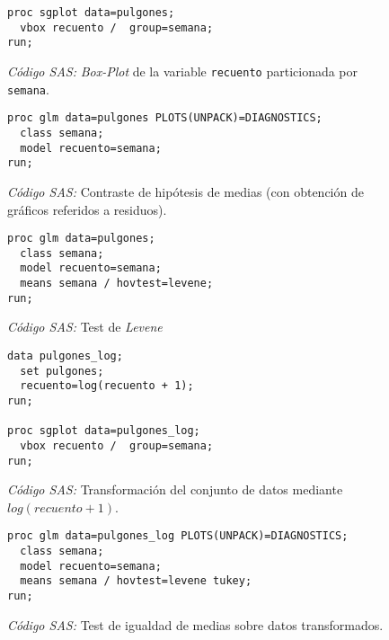 \documentclass[11pt]{article}
\begin{document}
    \begin{figure}[!h]
      \centering
      \begin{verbatim}
proc sgplot data=pulgones;
  vbox recuento /  group=semana;
run;
      \end{verbatim}
      \caption{\emph{Código SAS:} \emph{Box-Plot} de la variable \texttt{recuento} particionada por \texttt{semana}.}
      \label{code:sas_4}
    \end{figure}

    \begin{figure}[!h]
      \centering
      \begin{verbatim}
proc glm data=pulgones PLOTS(UNPACK)=DIAGNOSTICS;
  class semana;
  model recuento=semana;
run;
      \end{verbatim}
      \caption{\emph{Código SAS:} Contraste de hipótesis de medias (con obtención de gráficos referidos a residuos).}
      \label{code:sas_5}
    \end{figure}

    \begin{figure}[!h]
      \centering
      \begin{verbatim}
proc glm data=pulgones;
  class semana;
  model recuento=semana;
  means semana / hovtest=levene;
run;
      \end{verbatim}
      \caption{\emph{Código SAS:} Test de \emph{Levene}}
      \label{code:sas_6}
    \end{figure}


    \begin{figure}[!h]
      \centering
      \begin{verbatim}
data pulgones_log;
  set pulgones;
  recuento=log(recuento + 1);
run;

proc sgplot data=pulgones_log;
  vbox recuento /  group=semana;
run;
      \end{verbatim}
      \caption{\emph{Código SAS:} Transformación del conjunto de datos mediante $log(recuento + 1)$.}
      \label{code:sas_7}
    \end{figure}

    \begin{figure}[!h]
      \centering
      \begin{verbatim}
proc glm data=pulgones_log PLOTS(UNPACK)=DIAGNOSTICS;
  class semana;
  model recuento=semana;
  means semana / hovtest=levene tukey;
run;
      \end{verbatim}
      \caption{\emph{Código SAS:} Test de igualdad de medias sobre datos transformados.}
      \label{code:sas_8}
    \end{figure}
\end{document}
